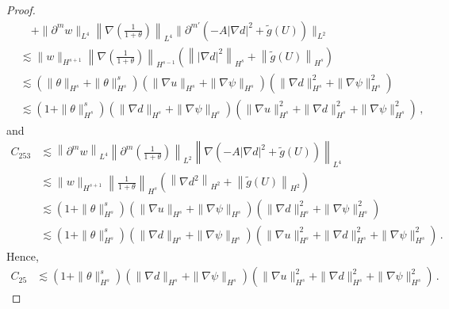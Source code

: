 \documentclass[10pt,a4paper]{amsart}
\begin{document}
\begin{proof}
\begin{equation*}
\begin{aligned}
&\quad + \| \partial^m w \|_{L^4} \left\| \nabla \left(\frac{1}{1+\theta}\right) \right\|_{L^4} \| \partial^{m'} (-A | \nabla d |^2 + \tilde{g}(U)) \|_{L^2}\\&
\lesssim \| w \|_{H^{s+1}} \left\| \nabla \left( \frac{1}{1+\theta} \right) \right\|_{H^{s-1}} \left( \left\| |\nabla d|^2 \right\|_{H^s} + \left\| \tilde{g}(U) \right\|_{H^s} \right) \\&
\lesssim \left( \| \theta \|_{H^s} + \| \theta \|_{H^s}^s \right) \left( \| \nabla u \|_{H^s} + \| \nabla \psi \|_{H^s} \right) \left( \| \nabla d \|_{H^s}^2 + \| \nabla \psi \|_{H^s}^2 \right) \\&
\lesssim (1+\| \theta \|_{H^s}^s) \left( \| \nabla d \|_{H^s} + \| \nabla \psi \|_{H^s} \right) \left( \| \nabla u \|_{H^s}^2 + \| \nabla d \|_{H^s}^2 + \| \nabla \psi \|_{H^s}^2 \right) \,,
\end{aligned}
\end{equation*}
and
\begin{equation*}
\begin{aligned}
C_{253}&\lesssim \left\| \partial^m w \right\|_{L^4} \left\| \partial^m \left( \frac{1}{1+\theta} \right) \right\|_{L^2} \left\| \nabla \left( -A |\nabla d|^2 + \tilde{g}(U) \right) \right\|_{L^4} \\&
\lesssim \| w \|_{H^{s+1}} \left\| \frac{1}{1+\theta} \right\|_{H^s} \left( \left\| \nabla d^2 \right\|_{H^2} + \left\| \tilde{g}(U) \right\|_{H^2} \right) \\&
\lesssim (1+\| \theta \|_{H^s}^s) \left( \| \nabla u \|_{H^s} + \| \nabla \psi \|_{H^s} \right) \left( \| \nabla d \|_{H^s}^2 + \| \nabla \psi \|_{H^s}^2 \right) \\&
\lesssim (1+\| \theta \|_{H^s}^s) \left( \| \nabla d \|_{H^s} + \| \nabla \psi \|_{H^s} \right) \left( \| \nabla u \|_{H^s}^2 + \| \nabla d \|_{H^s}^2 + \| \nabla \psi \|_{H^s}^2 \right) \,.
\end{aligned}
\end{equation*}
Hence,
\begin{equation}\label{gpsi-eq19}
\begin{aligned}
C_{25}&\lesssim (1+\| \theta \|_{H^s}^s) \left( \| \nabla d \|_{H^s} + \| \nabla \psi \|_{H^s} \right) \left( \| \nabla u \|_{H^s}^2 + \| \nabla d \|_{H^s}^2 + \| \nabla \psi \|_{H^s}^2 \right) \,.
\end{aligned}
\end{equation}


\end{proof}
\end{document}

